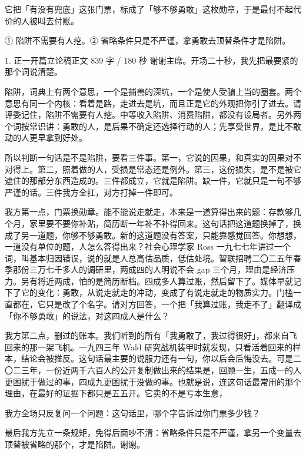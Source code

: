 \documentclass[script,pro]{debate}
\begin{document}
\debatetitle
\begin{thesisbox}[全场一句话立论]它把「有没有兜底」这张门票，标成了「够不够勇敢」这枚勋章，于是最付不起代价的人被叫去付账。\end{thesisbox}
\begin{thesisbox}[全场只守两句话]① 陷阱不需要有人挖。② 省略条件只是不严谨，拿勇敢去顶替条件才是陷阱。\end{thesisbox}

\begin{speech}{1. 正一开篇立论稿}{正文 839 字 / 180 秒}
谢谢主席。开场二十秒，我先把最要紧的那个词说清楚。

陷阱，词典上有两个意思，一个是捕兽的深坑，一个是使人受骗上当的圈套。两个意思有同一个内核：看着是路，走进去是坑，而且正是它的外观把你引了进去。请评委记住，陷阱不需要有人挖。中等收入陷阱、消费陷阱，都没有设局者。另外两个词按常识讲：勇敢的人，是后果不确定还选择行动的人；先享受世界，是比不敢动的人更早拿到好处。

所以判断一句话是不是陷阱，要看三件事。第一，它说的因果，和真实的因果对不对得上。第二，照着做的人，受损是常态还是例外。第三，这份损失，是不是被它遮住的那部分东西造成的。三件都成立，它就是陷阱。缺一件，它就只是一句不够严谨的话。三件我方全扛，对方打掉一件即可。

我方第一点，门票换勋章。能不能说走就走，本来是一道算得出来的题：存款够几个月，家里要不要你补贴，简历断一年补不补得回来。这句话把这道题换掉了，换成了另一道题，你够不够勇敢。新的这道题没有答案，只能靠感觉回答。你想想，一道没有单位的题，人怎么答得出来？社会心理学家 Ross 一九七七年讲过一个词，叫基本归因错误，说的就是人总高估品质，低估处境。智联招聘二〇二五年春季那份三万七千多人的调研里，两成四的人明说不会 gap 三个月，理由是经济压力。另有将近两成，怕的是简历断档。四成多人算过账，然后留下了。媒体早就记下了它的变化：勇敢，从说走就走的冲动，变成了有说走就走的物质实力。门槛一直都在，它只是改了个名字。请对方回答，一个把「我算过账，我走不了」翻译成「你不够勇敢」的说法，对这四成人是什么？

我方第二点，删过的账本。我们听到的所有「我勇敢了，我过得很好」，都来自飞回来的那一架飞机。一九四三年 Wald 研究战机装甲时就发现，只看活着回来的样本，结论会被推反。这句话最主要的说服力还有一句，你以后会后悔没去。可是二〇二三年，一份近两千六百人的公开复制做出来的结果是，回顾一生，五成一的人更困扰于做过的事，四成九更困扰于没做的事。也就是说，连这句话最常用的那个理由，在最好的证据下都只是五五开。它卖的不是亏本生意，

我方全场只反复问一个问题：这句话里，哪个字告诉过你门票多少钱？

最后我方先立一条规矩，免得后面吵不清：省略条件只是不严谨，拿另一个变量去顶替被省略的那个，才是陷阱。谢谢。
\end{speech}
\begin{contingency}
\end{contingency}
\end{document}
